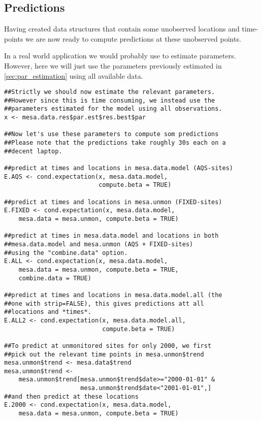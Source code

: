 \subsection{Predictions}
Having created data structures that contain some unobserved locations 
and time-points we are now ready to compute predictions at these unobserved 
points.

In a real world application we would probably use  
to estimate parameters. However, here we will just use the parameters 
previously estimated in \autoref{sec:par_estimation} using all available 
data.
\vspace*{-0.5\baselineskip}
\begin{verbatim}
##Strictly we should now estimate the relevant parameters.
##However since this is time consuming, we instead use the
##parameters estimated for the model using all observations.
x <- mesa.data.res$par.est$res.best$par

##Now let's use these parameters to compute som predictions
##Please note that the predictions take roughly 30s each on a 
##decent laptop.

##predict at times and locations in mesa.data.model (AQS-sites)
E.AQS <- cond.expectation(x, mesa.data.model, 
                          compute.beta = TRUE)

##predict at times and locations in mesa.unmon (FIXED-sites)
E.FIXED <- cond.expectation(x, mesa.data.model, 
    mesa.data = mesa.unmon, compute.beta = TRUE)

##predict at times in mesa.data.model and locations in both 
##mesa.data.model and mesa.unmon (AQS + FIXED-sites)
##using the "combine.data" option.
E.ALL <- cond.expectation(x, mesa.data.model, 
    mesa.data = mesa.unmon, compute.beta = TRUE, 
    combine.data = TRUE)

##predict at times and locations in mesa.data.model.all (the 
##one with strip=FALSE), this gives predictions att all 
##locations and *times*.
E.ALL2 <- cond.expectation(x, mesa.data.model.all, 
                           compute.beta = TRUE)

##To predict at unmonitored sites for only 2000, we first 
##pick out the relevant time points in mesa.unmon$trend
mesa.unmon$trend <- mesa.data$trend
mesa.unmon$trend <- 
    mesa.unmon$trend[mesa.unmon$trend$date>="2000-01-01" &
                     mesa.unmon$trend$date<"2001-01-01",]
##and then predict at these locations
E.2000 <- cond.expectation(x, mesa.data.model, 
    mesa.data = mesa.unmon, compute.beta = TRUE)
\end{verbatim}

